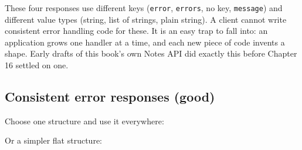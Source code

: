 \begin{codebox}[short]

\begin{Shaded}
\begin{Highlighting}[]
\end{Highlighting}
\end{Shaded}

\end{codebox}

\noindent{}These four responses use different keys (\texttt{error}, \texttt{errors}, no key, \texttt{message}) and different value types (string, list of strings, plain string). A client cannot write consistent error handling code for these. It is an easy trap to fall into: an application grows one handler at a time, and each new piece of code invents a shape. Early drafts of this book's own Notes API did exactly this before Chapter 16 settled on one.

\subsection*{Consistent error responses (good)}\label{34-response-handling:consistent-error-responses-good}

Choose one structure and use it everywhere:

\begin{codebox}[short]

\begin{Shaded}
\begin{Highlighting}[]
\FunctionTok{\{}
    \FunctionTok{:} \FunctionTok{\{}
        \FunctionTok{:} \FunctionTok{,}
        \FunctionTok{:} \FunctionTok{,}
        \FunctionTok{:} \OtherTok{[]}
    \FunctionTok{\}}
\FunctionTok{\}}
\end{Highlighting}
\end{Shaded}

\end{codebox}

\noindent{}Or a simpler flat structure:

\begin{codebox}[short]

\begin{Shaded}
\begin{Highlighting}[]
\FunctionTok{\{}
    \FunctionTok{:} 
\FunctionTok{\}}
\end{Highlighting}
\end{Shaded}

\end{codebox}

